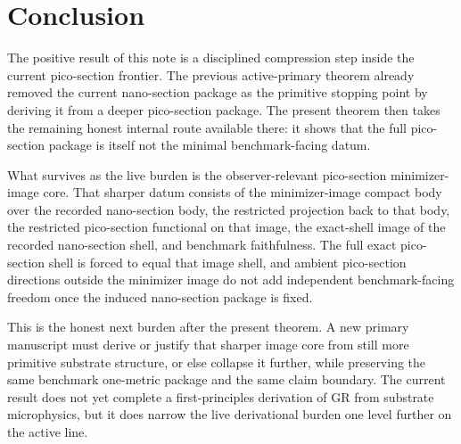 \documentclass[11pt]{article}
\begin{document}
\section{Conclusion}

The positive result of this note is a disciplined compression step inside the current pico-section frontier. The previous active-primary theorem already removed the current nano-section package as the primitive stopping point by deriving it from a deeper pico-section package. The present theorem then takes the remaining honest internal route available there: it shows that the full pico-section package is itself not the minimal benchmark-facing datum.

What survives as the live burden is the observer-relevant pico-section minimizer-image core. That sharper datum consists of the minimizer-image compact body over the recorded nano-section body, the restricted projection back to that body, the restricted pico-section functional on that image, the exact-shell image of the recorded nano-section shell, and benchmark faithfulness. The full exact pico-section shell is forced to equal that image shell, and ambient pico-section directions outside the minimizer image do not add independent benchmark-facing freedom once the induced nano-section package is fixed.

This is the honest next burden after the present theorem. A new primary manuscript must derive or justify that sharper image core from still more primitive substrate structure, or else collapse it further, while preserving the same benchmark one-metric package and the same claim boundary. The current result does not yet complete a first-principles derivation of GR from substrate microphysics, but it does narrow the live derivational burden one level further on the active line.
\end{document}
